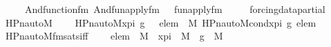 \begin{isabellebody}
\ \ \ \ \ And{\isacharparenleft}{\kern0pt}function{\isacharunderscore}{\kern0pt}fm{\isacharparenleft}{\kern0pt}{}{\isacharparenright}{\kern0pt}{\isacharcomma}{\kern0pt}\ And{\isacharparenleft}{\kern0pt}fun{\isacharunderscore}{\kern0pt}apply{\isacharunderscore}{\kern0pt}fm{\isacharparenleft}{\kern0pt}{}{\isacharcomma}{\kern0pt}\ {}{\isacharcomma}{\kern0pt}\ {}{\isacharparenright}{\kern0pt}{\isacharcomma}{\kern0pt}\ fun{\isacharunderscore}{\kern0pt}apply{\isacharunderscore}{\kern0pt}fm{\isacharparenleft}{\kern0pt}{}{}{\isacharcomma}{\kern0pt}\ {}{\isacharcomma}{\kern0pt}\ {}{\isacharparenright}{\kern0pt}{\isacharparenright}{\kern0pt}{\isacharparenright}{\kern0pt}{\isacharparenright}{\kern0pt}{\isacharparenright}{\kern0pt}{\isacharparenright}{\kern0pt}{\isacharparenright}{\kern0pt}{\isacharparenright}{\kern0pt}{\isacharparenright}{\kern0pt}{\isacharparenright}{\kern0pt}{\isacharparenright}{\kern0pt}{\isacharparenright}{\kern0pt}{\isacharparenright}{\kern0pt}{\isacharparenright}{\kern0pt}{\isacharparenright}{\kern0pt}{\isacharparenright}{\kern0pt}{\isacharparenright}{\kern0pt}{\isacharparenright}{\kern0pt}\ {\isachardoublequoteclose}\ \isanewline
\isanewline
\isanewline
{}\isamarkupfalse%
\ forcing{\isacharunderscore}{\kern0pt}data{\isacharunderscore}{\kern0pt}partial\ \isanewline
{}\ \isanewline
\isanewline
{}\isamarkupfalse%
\ HPn{\isacharunderscore}{\kern0pt}auto{\isacharunderscore}{\kern0pt}M\ \ \isanewline
\ \ {\isachardoublequoteopen}HPn{\isacharunderscore}{\kern0pt}auto{\isacharunderscore}{\kern0pt}M{\isacharparenleft}{\kern0pt}x{\isacharunderscore}{\kern0pt}pi{\isacharcomma}{\kern0pt}\ g{\isacharparenright}{\kern0pt}\ {\isasymequiv}\ {\isacharbraceleft}{\kern0pt}\ elem\ {\isasymin}\ M{\isachardot}{\kern0pt}\ HPn{\isacharunderscore}{\kern0pt}auto{\isacharunderscore}{\kern0pt}M{\isacharunderscore}{\kern0pt}cond{\isacharparenleft}{\kern0pt}x{\isacharunderscore}{\kern0pt}pi{\isacharcomma}{\kern0pt}\ g{\isacharcomma}{\kern0pt}\ elem{\isacharparenright}{\kern0pt}\ {\isacharbraceright}{\kern0pt}{\isachardoublequoteclose}\isanewline
\isanewline
{}\isamarkupfalse%
\ HPn{\isacharunderscore}{\kern0pt}auto{\isacharunderscore}{\kern0pt}M{\isacharunderscore}{\kern0pt}fm{\isacharunderscore}{\kern0pt}sats{\isacharunderscore}{\kern0pt}iff\ {\isacharcolon}{\kern0pt}\ \isanewline
\ \ {\isachardoublequoteopen}elem\ {\isasymin}\ M\ {\isasymLongrightarrow}\ x{\isacharunderscore}{\kern0pt}pi\ {\isasymin}\ M\ {\isasymLongrightarrow}\ g\ {\isasymin}\ M\ {\isasymLongrightarrow}\ \isanewline

\end{isabellebody}
